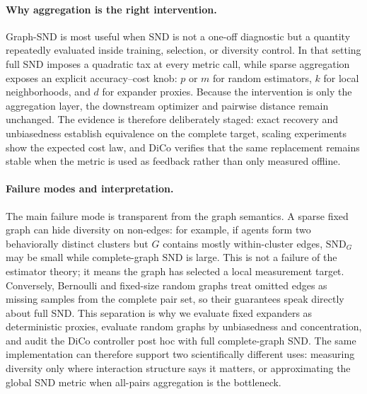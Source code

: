 \documentclass{article}
\theoremstyle{plain}
\theoremstyle{definition}
\theoremstyle{remark}
\newcommand{\SND}{\ensuremath{\mathrm{SND}}}
\newcommand{\SNDG}{\mathrm{SND}_{G}}
\begin{document}
\paragraph{Why aggregation is the right intervention.}
Graph-SND is most useful when SND is not a one-off diagnostic but a
quantity repeatedly evaluated inside training, selection, or diversity
control. In that setting full SND imposes a quadratic tax at every metric
call, while sparse aggregation exposes an explicit accuracy--cost knob:
$p$ or $m$ for random estimators, $k$ for local neighborhoods, and $d$
for expander proxies. Because the intervention is only the aggregation
layer, the downstream optimizer and pairwise distance remain unchanged.
The evidence is therefore deliberately staged: exact recovery and
unbiasedness establish equivalence on the complete target, scaling
experiments show the expected cost law, and DiCo verifies that the same
replacement remains stable when the metric is used as feedback rather
than only measured offline.

\paragraph{Failure modes and interpretation.}
The main failure mode is transparent from the graph semantics. A sparse
fixed graph can hide diversity on non-edges: for example, if agents form
two behaviorally distinct clusters but $G$ contains mostly within-cluster
edges, $\SNDG$ may be small while complete-graph $\SND$ is large. This is
not a failure of the estimator theory; it means the graph has selected a
local measurement target. Conversely, Bernoulli and fixed-size random
graphs treat omitted edges as missing samples from the complete pair set,
so their guarantees speak directly about full SND. This separation is why
we evaluate fixed expanders as deterministic proxies, evaluate random
graphs by unbiasedness and concentration, and audit the DiCo controller
post hoc with full complete-graph SND. The same implementation can
therefore support two scientifically different uses: measuring diversity
only where interaction structure says it matters, or approximating the
global SND metric when all-pairs aggregation is the bottleneck.
\end{document}

